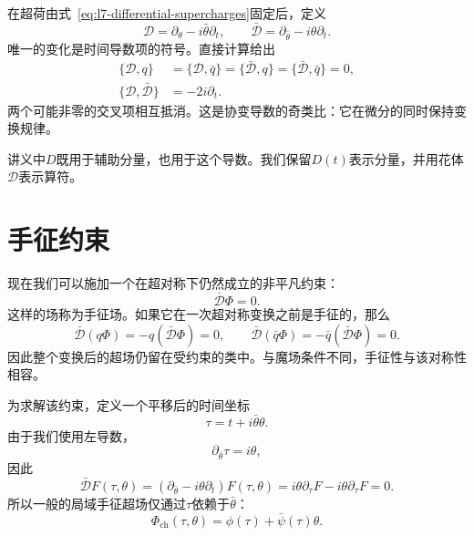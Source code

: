 在超荷由式~\eqref{eq:l7-differential-supercharges}固定后，定义
\begin{equation}
\mathcal D=\partial_\theta-i\bar\theta\partial_t,
\qquad
\bar{\mathcal D}=\partial_{\bar\theta}-i\theta\partial_t.
\label{eq:l7-covariant-derivatives}
\end{equation}
唯一的变化是时间导数项的符号。直接计算给出
\begin{align}
\{\mathcal D,q\}
&=\{\mathcal D,\bar q\}
=\{\bar{\mathcal D},q\}
=\{\bar{\mathcal D},\bar q\}=0,\\
\{\mathcal D,\bar{\mathcal D}\}&=-2i\partial_t.
\label{eq:l7-covariant-algebra}
\end{align}
两个可能非零的交叉项相互抵消。这是协变导数的奇类比：它在微分的同时保持变换规律。

讲义中\(D\)既用于辅助分量，也用于这个导数。我们保留\(D(t)\)表示分量，并用花体\(\mathcal D\)表示算符。

\section{手征约束}

现在我们可以施加一个在超对称下仍然成立的非平凡约束：
\begin{equation}
\bar{\mathcal D}\Phi=0.
\label{eq:l7-chiral-constraint}
\end{equation}
这样的场称为手征场。如果它在一次超对称变换之前是手征的，那么
\begin{equation}
\bar{\mathcal D}(q\Phi)
=-q(\bar{\mathcal D}\Phi)=0,
\qquad
\bar{\mathcal D}(\bar q\Phi)
=-\bar q(\bar{\mathcal D}\Phi)=0.
\end{equation}
因此整个变换后的超场仍留在受约束的类中。与魔场条件不同，手征性与该对称性相容。

为求解该约束，定义一个平移后的时间坐标
\begin{equation}
\tau=t+i\bar\theta\theta.
\label{eq:l7-chiral-time}
\end{equation}
由于我们使用左导数，
\begin{equation}
\partial_{\bar\theta}\tau=i\theta,
\end{equation}
因此
\begin{equation}
\bar{\mathcal D}F(\tau,\theta)
=\left(\partial_{\bar\theta}-i\theta\partial_t\right)F(\tau,\theta)
=i\theta\partial_\tau F-i\theta\partial_\tau F=0.
\end{equation}
所以一般的局域手征超场仅通过\(\tau\)依赖于\(\bar\theta\)：
\begin{equation}
\Phi_{\mathrm{ch}}(\tau,\theta)
=\phi(\tau)+\bar\psi(\tau)\theta.
\label{eq:l7-chiral-field-tau}
\end{equation}

